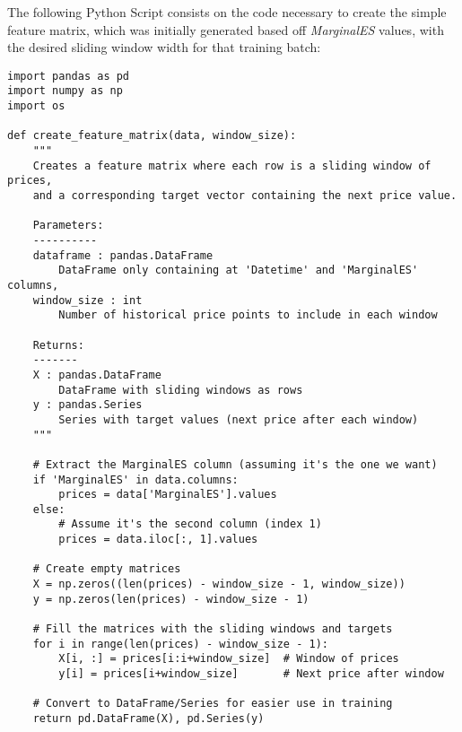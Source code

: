 \documentclass[12pt]{report} %
\begin{document}

The following Python Script consists on the code necessary to create the simple feature matrix, which was initially generated based off \textit{MarginalES} values, with the desired sliding window width for that training batch:
\begin{lstlisting}
import pandas as pd
import numpy as np
import os

def create_feature_matrix(data, window_size):
    """
    Creates a feature matrix where each row is a sliding window of prices,
    and a corresponding target vector containing the next price value.
    
    Parameters:
    ----------
    dataframe : pandas.DataFrame
        DataFrame only containing at 'Datetime' and 'MarginalES' columns, 
    window_size : int
        Number of historical price points to include in each window
    
    Returns:
    -------
    X : pandas.DataFrame
        DataFrame with sliding windows as rows
    y : pandas.Series
        Series with target values (next price after each window)
    """
    
    # Extract the MarginalES column (assuming it's the one we want)
    if 'MarginalES' in data.columns:
        prices = data['MarginalES'].values
    else:
        # Assume it's the second column (index 1)
        prices = data.iloc[:, 1].values
    
    # Create empty matrices
    X = np.zeros((len(prices) - window_size - 1, window_size))
    y = np.zeros(len(prices) - window_size - 1)
    
    # Fill the matrices with the sliding windows and targets
    for i in range(len(prices) - window_size - 1):
        X[i, :] = prices[i:i+window_size]  # Window of prices
        y[i] = prices[i+window_size]       # Next price after window
    
    # Convert to DataFrame/Series for easier use in training
    return pd.DataFrame(X), pd.Series(y)
\end{lstlisting}
\end{document}
